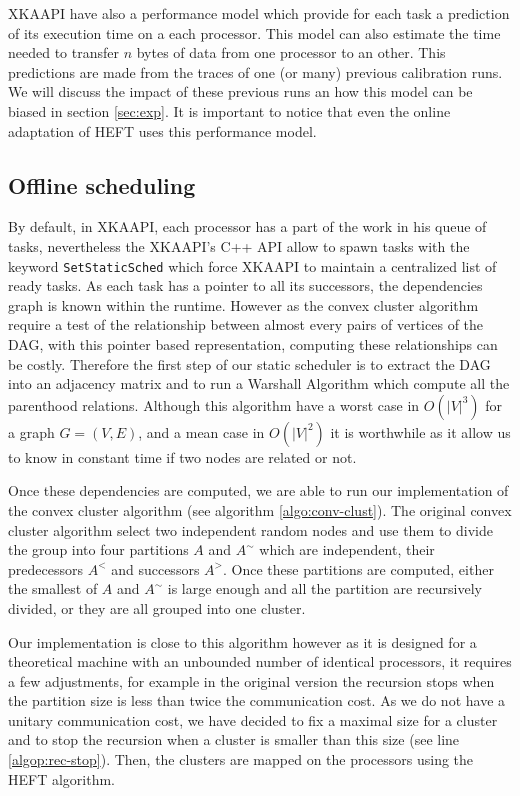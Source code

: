 \documentclass[10pt, conference, compsocconf,pdftex,dvipsnames]{IEEEtran}
\begin{document}
XKAAPI have also a performance model which provide for each task a prediction
of its execution time on a each processor. This model can also estimate the 
time needed to transfer $n$ bytes of data from one processor to an other. This
predictions are made from the traces of one (or many) previous calibration
runs. We will discuss the impact of these previous runs an how this model can
be biased in section \ref{sec:exp}. It is important to notice that even the
online adaptation of HEFT uses this performance model.

\subsection{Offline scheduling}
\label{sec:impl-off}
By default, in XKAAPI, each processor has a part of the work in his queue of
tasks, nevertheless the XKAAPI's C++ API allow to spawn tasks with the keyword
\texttt{SetStaticSched} which force XKAAPI to maintain a centralized list of
ready tasks. As each task has a pointer to all its successors, the
dependencies graph is known within the runtime. However as the convex cluster
algorithm require a test of the relationship between almost every pairs of
vertices of the DAG,  with this pointer based representation, computing these
relationships can be costly. Therefore the first step of our static scheduler
is to extract the DAG into an adjacency matrix and to run a Warshall Algorithm
which compute all the parenthood relations. Although this algorithm have a
worst case in $O(|V|^3)$ for a graph $G=(V,E)$, and a mean case in $O(|V|^2)$
it is worthwhile as it allow us to know in constant time if two nodes are
related or not.

Once these dependencies are computed, we are able to run our implementation of
the convex cluster algorithm (see algorithm \ref{algo:conv-clust}). The
original convex cluster algorithm select two independent random nodes and use
them to divide the group into four partitions $A$ and $A^{\sim}$ which are
independent, their predecessors $A^<$ and successors $A^>$. Once these
partitions are computed, either the smallest of $A$ and $A^{\sim}$ is large
enough and all the partition are recursively divided, or they are all grouped
into one cluster. 

Our implementation is close to this algorithm however as it is designed for a
theoretical machine with an unbounded number of identical processors, it
requires a few adjustments, for example in the original version the recursion
stops when the partition size is less than twice the communication cost. As we
do not have a unitary communication cost, we have decided to fix a maximal
size for a cluster and to stop the recursion when a cluster is smaller than
this size (see line \ref{algop:rec-stop}). Then, the clusters are mapped on the
processors using the HEFT algorithm. 
\end{document}
